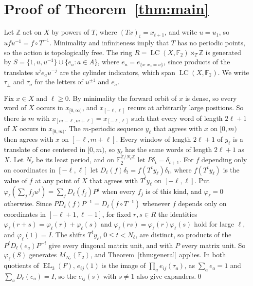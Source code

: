 \documentclass[11pt]{amsart}
\newcommand{\F}{\mathbb F}
\newcommand{\Z}{\mathbb Z}
\newcommand{\LC}{\operatorname{LC}}
\newcommand{\EL}{\operatorname{EL}}
\begin{document}
\section{Proof of Theorem~\ref{thm:main}}\label{sec:main}

Let $\Z$ act on $X$ by powers of $T$, where $(Tx)_t=x_{t+1}$, and write
$u=u_1$, so $ufu^{-1}=f\circ T^{-1}$. Minimality and infiniteness imply
that $T$ has no periodic points, so the action is topologically free. The
ring $R=\LC(X,\F_2)\rtimes_T\Z$ is generated by
$S=\{1,u,u^{-1}\}\cup\{e_a:a\in A\}$, where $e_a=e_{\{x:x_0=a\}}$, since
products of the translates $u^je_au^{-j}$ are the cylinder indicators,
which span $\LC(X,\F_2)$. We write $\tau_\pm$ and $\tau_a$ for the letters
of $u^{\pm1}$ and $e_a$.

Fix $x\in X$ and $\ell\ge0$. By minimality the forward orbit of $x$ is
dense, so every word of $X$ occurs in $x_{[0,\infty)}$, and
$x_{[-\ell,\ell]}$ recurs at arbitrarily large positions. So there is $m$
with $x_{[m-\ell,m+\ell]}=x_{[-\ell,\ell]}$ such that every word of length
$2\ell+1$ of $X$ occurs in $x_{[0,m)}$. The $m$-periodic sequence $y_\ell$
that agrees with $x$ on $[0,m)$ then agrees with $x$ on $[-\ell,m+\ell]$.
Every window of length $2\ell+1$ of $y_\ell$ is a translate of one
centered in $[0,m)$, so $y_\ell$ has the same words of length $2\ell+1$ as
$X$. Let $N_\ell$ be its least period, and on $\F_2^{\Z/N_\ell\Z}$ let
$P\delta_t=\delta_{t+1}$. For $f$ depending only on coordinates in
$[-\ell,\ell]$ let $D_\ell(f)\delta_t=f(T^ty_\ell)\delta_t$, where
$f(T^ty_\ell)$ is the value of $f$ at any point of $X$ that agrees with
$T^ty_\ell$ on $[-\ell,\ell]$. Put
$\varphi_\ell(\sum_jf_ju^j)=\sum_jD_\ell(f_j)P^j$ when every $f_j$ is of
this kind, and $\varphi_\ell=0$ otherwise. Since
$PD_\ell(f)P^{-1}=D_\ell(f\circ T^{-1})$ whenever $f$ depends only on
coordinates in $[-\ell+1,\ell-1]$, for fixed $r,s\in R$ the identities
$\varphi_\ell(r+s)=\varphi_\ell(r)+\varphi_\ell(s)$ and
$\varphi_\ell(rs)=\varphi_\ell(r)\varphi_\ell(s)$ hold for large $\ell$, and
$\varphi_\ell(1)=I$. The shifts $T^ty_\ell$, $0\le t<N_\ell$, are distinct,
so products of the $P^iD_\ell(e_a)P^{-i}$ give every diagonal matrix unit,
and with $P$ every matrix unit. So $\varphi_\ell(S)$ generates
$M_{N_\ell}(\F_2)$, and Theorem~\ref{thm:general} applies. In both
quotients of $\EL_3(F)$, $e_{ij}(1)$ is the image of
$\prod_ae_{ij}(\tau_a)$, as $\sum_ae_a=1$ and $\sum_aD_\ell(e_a)=I$, so the
$e_{ij}(s)$ with $s\ne1$ also give expanders.\qed

\end{document}
